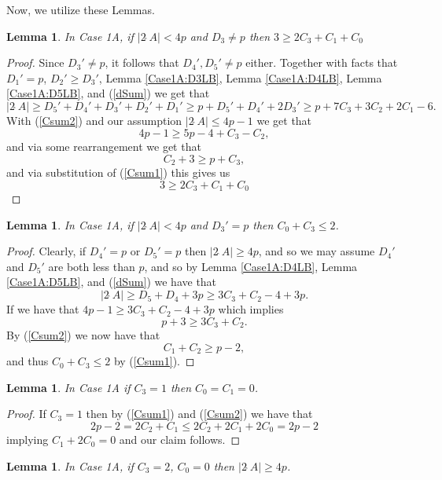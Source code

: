 \documentclass[a4paper, 12pt]{article}\usepackage[english]{babel}
\newtheorem{lem}[thm]{Lemma}
\newcommand{\<}{\langle}
\begin{document}
  Now, we utilize these Lemmas.
\begin{lem}\label{Case1A:D3lp}
        In Case 1A, if $|2\hat{\;}A|<4p$ and $D_3\neq p$ then $3\geq 2C_3+C_1+C_0$
\end{lem}
\begin{proof}
   Since $D_3'\neq p$, it follows that $D_4',D_5'\neq p$ either. Together with facts that $D_1'=p$, $D_2'\geq D_3'$,  Lemma \ref{Case1A:D3LB}, Lemma \ref{Case1A:D4LB}, Lemma \ref{Case1A:D5LB}, and (\ref{dSum}) we get that
\[|2\hat{\;}A|\geq D_5'+D_4'+D_3'+D_2'+D_1'\geq p+D_5'+D_4'+2D_3'\geq p+ 7C_3+3C_2+2C_1-6.\] With (\ref{Csum2}) and our assumption $|2\hat{\;}A|\leq 4p-1$ we get that \[4p-1\geq 5p-4+C_3-C_2,\] and via some rearrangement we get that \[C_2+3\geq p+C_3,\] and via substitution of (\ref{Csum1}) this gives us\[3\geq 2C_3+C_1+C_0\]
\end{proof}
\begin{lem}\label{Case1A:D3p}
    In Case 1A, if $|2\hat{\;}A|<4p$ and $D_3'=p$ then $C_0+C_3\leq 2$.
\end{lem}
\begin{proof}
Clearly, if $D_4'=p$ or $D_5'=p$ then $|2\hat{\;}A|\geq 4p$, and so we may assume $D_4'$ and $D_5'$ are both less than $p$, and so by Lemma \ref{Case1A:D4LB}, Lemma \ref{Case1A:D5LB}, and (\ref{dSum}) we have that 
\[|2\hat{\;}A|\geq D_5+D_4+3p\geq 3C_3+C_2-4+3p.\] If we have that $4p-1\geq  3C_3+C_2-4+3p$ which implies \[p+3\geq 3C_3+C_2.\] By (\ref{Csum2}) we now have that \[C_1+C_2\geq p-2,\] and thus $C_0+C_3\leq 2$ by (\ref{Csum1}).
\end{proof}
\begin{lem}\label{Case1A:C3e1}
    In Case 1A if $C_3=1$ then $C_0=C_1=0$.
\end{lem}
\begin{proof}
   If $C_3=1$ then by (\ref{Csum1}) and (\ref{Csum2}) we have that \[2p-2=2C_2+C_1\leq 2C_2+2C_1+2C_0=2p-2\] implying $C_1+2C_0=0$ and our claim follows.
\end{proof}
\begin{lem}\label{Case1A:c3e2}
    In Case 1A, if $C_3=2$, $C_0=0$ then $|2\hat{\;}A|\geq 4p$.
\end{lem}
\end{document}
